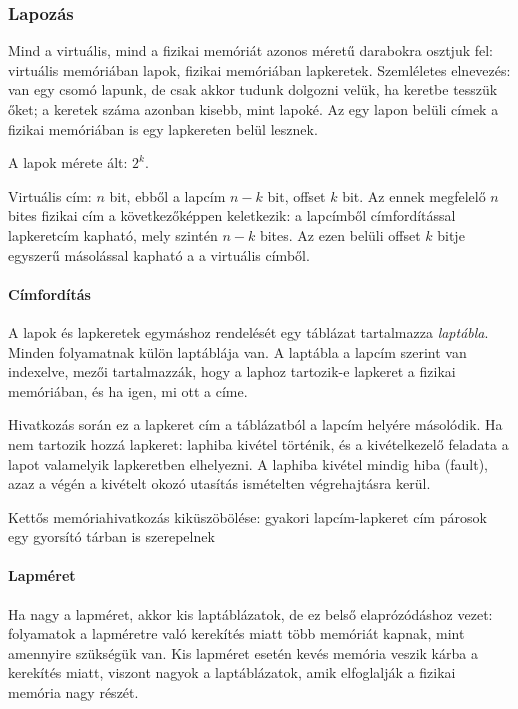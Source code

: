 \documentclass[fleqn,10pt,a4paper]{article}
\theoremstyle{magyar}
\begin{document}
  \subsubsection{Lapozás}
  
  Mind a virtuális, mind a fizikai memóriát azonos méretű darabokra osztjuk fel: virtuális memóriában lapok, fizikai
  memóriában lapkeretek. Szemléletes elnevezés: van egy csomó lapunk, de csak akkor tudunk dolgozni velük, ha keretbe
  tesszük őket; a keretek száma azonban kisebb, mint lapoké. Az egy lapon belüli címek a fizikai memóriában is egy
  lapkereten belül lesznek.

  A lapok mérete ált: $2^k$.
  
  Virtuális cím: $n$ bit, ebből a lapcím $n-k$ bit, offset $k$ bit. Az ennek megfelelő $n$ bites fizikai cím a
  következőképpen keletkezik: a lapcímből címfordítással lapkeretcím kapható, mely szintén $n-k$ bites. Az ezen belüli
  offset $k$ bitje egyszerű másolással kapható a a virtuális címből.
  

  \paragraph{Címfordítás} A lapok és lapkeretek egymáshoz rendelését egy táblázat tartalmazza \emph{laptábla}. Minden
  folyamatnak külön laptáblája van. A laptábla a lapcím szerint van indexelve, mezői tartalmazzák, hogy a laphoz
  tartozik-e lapkeret a fizikai memóriában, és ha igen, mi ott a címe.  
  
  Hivatkozás során ez a lapkeret cím a táblázatból a lapcím helyére másolódik. Ha nem tartozik hozzá lapkeret: laphiba
  kivétel történik, és a kivételkezelő feladata a lapot valamelyik lapkeretben elhelyezni. A laphiba kivétel mindig hiba
  (fault), azaz a végén a kivételt okozó utasítás ismételten végrehajtásra kerül.  

  Kettős memóriahivatkozás kiküszöbölése: gyakori lapcím-lapkeret cím párosok egy gyorsító tárban is szerepelnek

  \paragraph{Lapméret} Ha nagy a lapméret, akkor kis laptáblázatok, de ez belső elaprózódáshoz vezet: folyamatok a
  lapméretre való kerekítés miatt több memóriát kapnak, mint amennyire szükségük van. Kis lapméret esetén kevés memória
  veszik kárba a kerekítés miatt, viszont nagyok a laptáblázatok, amik elfoglalják a fizikai memória nagy részét.
  
\end{document}
